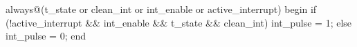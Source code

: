 \begin{vcode}
always@(t_state or clean_int or int_enable or active_interrupt)
begin
    if (!active_interrupt && int_enable && t_state && clean_int)
        int_pulse = 1;
    else
        int_pulse = 0;
end
\end{vcode}

